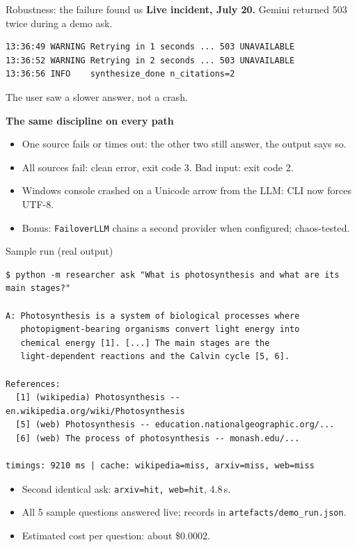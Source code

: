 \documentclass[aspectratio=169,10pt]{beamer}
\begin{document}
\begin{frame}[fragile]{Robustness: the failure found us}
  \textbf{Live incident, July 20.} Gemini returned 503 twice during a demo ask.

  \begin{lstlisting}[style=python,numbers=none,basicstyle=\ttfamily\scriptsize]
13:36:49 WARNING Retrying in 1 seconds ... 503 UNAVAILABLE
13:36:52 WARNING Retrying in 2 seconds ... 503 UNAVAILABLE
13:36:56 INFO    synthesize_done n_citations=2
  \end{lstlisting}

  The user saw a slower answer, not a crash.

  \vspace{0.6em}
  \textbf{The same discipline on every path}
  \begin{itemize}\setlength\itemsep{0.3em}
    \item One source fails or times out: the other two still answer, the output says so.
    \item All sources fail: clean error, exit code 3. Bad input: exit code 2.
    \item Windows console crashed on a Unicode arrow from the LLM: CLI now forces UTF-8.
    \item Bonus: \texttt{FailoverLLM} chains a second provider when configured; chaos-tested.
  \end{itemize}
\end{frame}

\begin{frame}[fragile]{Sample run (real output)}
  \begin{lstlisting}[style=python,numbers=none,basicstyle=\ttfamily\scriptsize]
$ python -m researcher ask "What is photosynthesis and what are its main stages?"

A: Photosynthesis is a system of biological processes where
   photopigment-bearing organisms convert light energy into
   chemical energy [1]. [...] The main stages are the
   light-dependent reactions and the Calvin cycle [5, 6].

References:
  [1] (wikipedia) Photosynthesis -- en.wikipedia.org/wiki/Photosynthesis
  [5] (web) Photosynthesis -- education.nationalgeographic.org/...
  [6] (web) The process of photosynthesis -- monash.edu/...

timings: 9210 ms | cache: wikipedia=miss, arxiv=miss, web=miss
  \end{lstlisting}

  \vspace{0.4em}
  \begin{itemize}\setlength\itemsep{0.3em}
    \item Second identical ask: \texttt{arxiv=hit, web=hit}, 4.8\,s.
    \item All 5 sample questions answered live; records in \texttt{artefacts/demo\_run.json}.
    \item Estimated cost per question: about \$0.0002.
  \end{itemize}
\end{frame}
\end{document}
